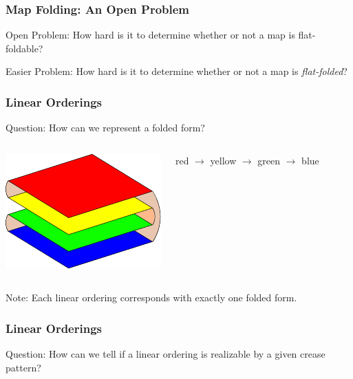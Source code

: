 \documentclass{beamer}
\begin{document}
\begin{frame}
\frametitle{Map Folding: An Open Problem}

\begin{block}{Open Problem:}
How hard is it to determine whether or not a map is flat-foldable?
\end{block}

\bigskip
\bigskip
\bigskip

\pause
\begin{block}{Easier Problem:}
How hard is it to determine whether or not a map is \textit{flat-folded}?
\end{block}

\end{frame}
\begin{frame}

\frametitle{Linear Orderings}

\begin{block}{Question:}
How can we represent a folded form?
\end{block}

\bigskip
\bigskip

\begin{columns}[c]
\includegraphics[height=.3\textheight]{sam_images/2x2-map-folded.pdf}

\pause


red $\rightarrow$ yellow $\rightarrow$ green $\rightarrow$ blue

\end{columns}

\pause

\begin{block}{Note:}
Each linear ordering corresponds with exactly one folded form.
\end{block}

\end{frame}
\begin{frame}

\frametitle{Linear Orderings}

\begin{block}{Question:}
How can we tell if a linear ordering is realizable by a given crease pattern?
\end{block}

\bigskip
\bigskip

\end{frame}
\end{document}
